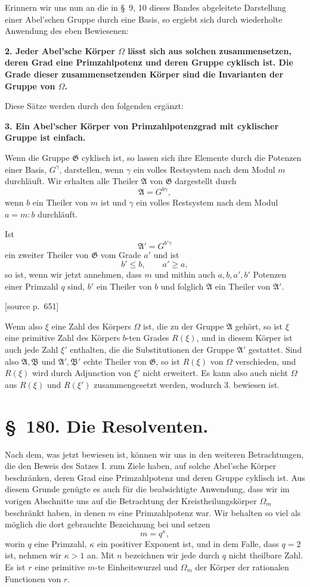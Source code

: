 \documentclass[11pt]{article}
\newcommand{\Om}{\Omega}
\newcommand{\Gg}{\mathfrak G}
\newcommand{\Aa}{\mathfrak A}
\newcommand{\Bb}{\mathfrak B}
\newcommand{\srcpage}[1]{\par\medskip\noindent\textsf{[source p.~#1]}\par\smallskip}
\begin{document}
Erinnern wir uns nun an die in \S~9, 10 dieses Bandes abgeleitete Darstellung einer Abel'schen Gruppe durch eine Basis, so ergiebt sich durch wiederholte Anwendung des eben Bewiesenen:

\textbf{2. Jeder Abel'sche Körper $\Om$ lässt sich aus solchen zusammensetzen, deren Grad eine Primzahlpotenz und deren Gruppe cyklisch ist. Die Grade dieser zusammensetzenden Körper sind die Invarianten der Gruppe von $\Om$.}

Diese Sätze werden durch den folgenden ergänzt:

\textbf{3. Ein Abel'scher Körper von Primzahlpotenzgrad mit cyklischer Gruppe ist einfach.}

Wenn die Gruppe $\Gg$ cyklisch ist, so lassen sich ihre Elemente durch die Potenzen einer Basis, $G^\gamma$, darstellen, wenn $\gamma$ ein volles Restsystem nach dem Modul $m$ durchläuft. Wir erhalten alle Theiler $\Aa$ von $\Gg$ dargestellt durch
\[
  \Aa=G^{b\gamma},
\]
wenn $b$ ein Theiler von $m$ ist und $\gamma$ ein volles Restsystem nach dem Modul $a=m:b$ durchläuft.

Ist
\[
  \Aa'=G^{b'\gamma}
\]
ein zweiter Theiler von $\Gg$ vom Grade $a'$ und ist
\[
  b'\le b,
  \qquad a'\ge a,
\]
so ist, wenn wir jetzt annehmen, dass $m$ und mithin auch $a,b,a',b'$ Potenzen einer Primzahl $q$ sind, $b'$ ein Theiler von $b$ und folglich $\Aa$ ein Theiler von $\Aa'$.

\srcpage{651}
Wenn also $\xi$ eine Zahl des Körpers $\Om$ ist, die zu der Gruppe $\Aa$ gehört, so ist $\xi$ eine primitive Zahl des Körpers $b$-ten Grades $R(\xi)$, und in diesem Körper ist auch jede Zahl $\xi'$ enthalten, die die Substitutionen der Gruppe $\Aa'$ gestattet. Sind also $\Aa,\Bb$ und $\Aa',\Bb'$ echte Theiler von $\Gg$, so ist $R(\xi)$ von $\Om$ verschieden, und $R(\xi)$ wird durch Adjunction von $\xi'$ nicht erweitert. Es kann also auch nicht $\Om$ aus $R(\xi)$ und $R(\xi')$ zusammengesetzt werden, wodurch 3. bewiesen ist.

\section*{\S~180. Die Resolventen.}

Nach dem, was jetzt bewiesen ist, können wir uns in den weiteren Betrachtungen, die den Beweis des Satzes I. zum Ziele haben, auf solche Abel'sche Körper beschränken, deren Grad eine Primzahlpotenz und deren Gruppe cyklisch ist. Aus diesem Grunde genügte es auch für die beabsichtigte Anwendung, dass wir im vorigen Abschnitte uns auf die Betrachtung der Kreistheilungskörper $\Omega_m$ beschränkt haben, in denen $m$ eine Primzahlpotenz war. Wir behalten so viel als möglich die dort gebrauchte Bezeichnung bei und setzen
\begin{equation}
  m=q^\kappa,
\tag{1}
\end{equation}
worin $q$ eine Primzahl, $\kappa$ ein positiver Exponent ist, und in dem Falle, dass $q=2$ ist, nehmen wir $\kappa>1$ an. Mit $n$ bezeichnen wir jede durch $q$ nicht theilbare Zahl. Es ist $r$ eine primitive $m$-te Einheitswurzel und $\Omega_m$ der Körper der rationalen Functionen von $r$.
\end{document}

